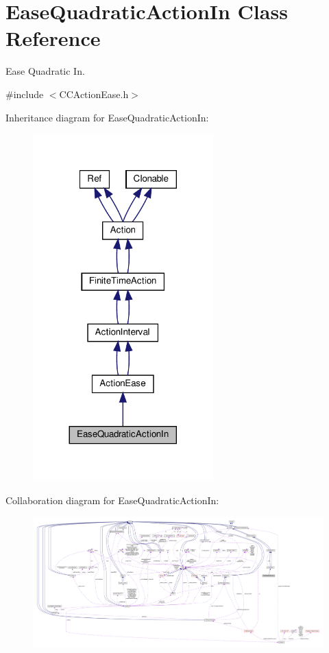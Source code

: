 \hypertarget{classEaseQuadraticActionIn}{}\section{Ease\+Quadratic\+Action\+In Class Reference}
\label{classEaseQuadraticActionIn}


Ease Quadratic In.  




{\ttfamily \#include $<$C\+C\+Action\+Ease.\+h$>$}



Inheritance diagram for Ease\+Quadratic\+Action\+In\+:
\nopagebreak
\begin{figure}[H]
\begin{center}
\leavevmode
\includegraphics[width=197pt]{classEaseQuadraticActionIn__inherit__graph}
\end{center}
\end{figure}


Collaboration diagram for Ease\+Quadratic\+Action\+In\+:
\nopagebreak
\begin{figure}[H]
\begin{center}
\leavevmode
\includegraphics[width=350pt]{classEaseQuadraticActionIn__coll__graph}
\end{center}
\end{figure}

